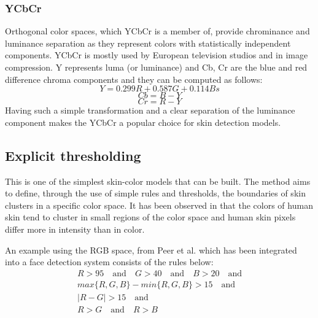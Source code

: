 \documentclass[12pt]{report}
\begin{document}
	\subsubsection{YCbCr}
	Orthogonal color spaces, which YCbCr is a member of, provide chrominance and luminance separation as they represent colors with statistically independent components. YCbCr is mostly used by European television studios and in image compression\cite{survey_color_detection_techniques}. Y represents luma (or luminance) and Cb, Cr are the blue and red difference chroma components and they can be computed as follows:
	\begin{equation}
	Y = 0.299R + 0.587G + 0.114Bs
	\end{equation}
	\begin{equation}
	Cb = B - Y
	\end{equation}
	\begin{equation}
	Cr = R - Y
	\end{equation}
	Having such a simple transformation and a clear separation of the luminance component makes the YCbCr a popular choice for skin detection models.
	
	\subsection{Explicit thresholding}
	This is one of the simplest skin-color models that can be built. The method aims to define, through the use of simple rules and thresholds, the boundaries of skin clusters in a specific color space. It has been observed in \cite{threshold_cluster} that the colors of human skin tend to cluster in small regions of the color space and human skin pixels differ more in intensity than in color.
	
	An example using the RGB space, from Peer et al.\cite{rgb_threshold} which has been integrated into a face detection system consists of the rules below:
	\begin{equation}
	\begin{split}
	R > 95 \quad \textrm{and} \quad G > 40 \quad \textrm{and} \quad B > 20 \quad \textrm{and} \\ 
	max\{R, G, B\} - min\{R, G, B\} > 15 \quad \textrm{and}\\
	|R - G| > 15 \quad \textrm{and}\\
	R > G \quad \textrm{and} \quad R > B
	\end{split}
	\end{equation}
	
\end{document}
